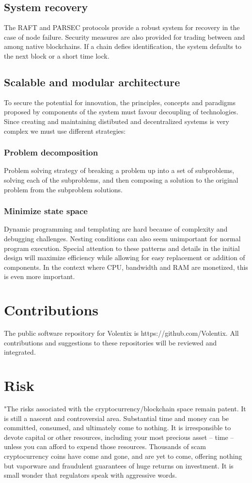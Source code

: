 \documentclass[]{article}
\begin{document}
{	
	 
	\subsection{System recovery}
	The RAFT and PARSEC protocols provide a robust system for recovery in the case of node failure. Security measures are also provided for trading between and among native blockchains. If a chain defies identification, the system defaults to the next block or a short time lock. 
	
	
	\subsection{Scalable and modular architecture}
	To secure the potential for innovation, the principles, 
	concepts and paradigms proposed by components of the system
	must favour decoupling of technologies. 
	Since creating and maintaining distibuted and decentralized systems
	is very complex we must use different strategies: 
	\subsubsection{Problem decomposition}
	Problem solving strategy of breaking a problem up into a set of subproblems, solving each of the subproblems, 
	and then composing a solution to the original problem from the subproblem solutions.
	\subsubsection{Minimize state space}
	Dynamic programming and templating are hard because of complexity and debugging challenges. 
	Nesting conditions can also seem unimportant for normal program execution.
	Special attention to these patterns and details in the initial design will maximize efficiency while allowing for easy replacement or addition of components.   
	In the context where CPU, bandwidth and RAM are monetized, this is even more important. 

\section{Contributions}
The public software repository for Volentix is https://github.com/Volentix.
All contributions and suggestions to these repositories will be reviewed and integrated. 
	
\section{Risk}
	"The risks associated with the cryptocurrency/blockchain space remain patent. It is still a nascent and controversial area. Substantial time and money can be committed, consumed, and ultimately come to nothing. It is irresponsible to devote capital or other resources, including your most precious asset -- time -- unless you can afford to expend those resources. Thousands of scam cryptocurrency coins have come and gone, and are yet to come, offering nothing but vaporware and fraudulent guarantees of huge returns on investment. It is small wonder that regulators speak with aggressive words. 
	
}
\end{document}
